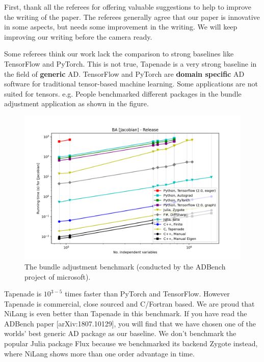 \documentclass{article}
\begin{document}
First, thank all the referees for offering valuable suggestions to help to improve the writing of the paper.
The referees generally agree that our paper is innovative in some aspects, but needs some improvement in the writing.
We will keep improving our writing before the camera ready.

Some referees think our work lack the comparison to strong baselines like TensorFlow and PyTorch.
This is not true, Tapenade is a very strong baseline in the field of \textbf{generic} AD.
TensorFlow and PyTorch are \textbf{domain specific} AD software for traditional tensor-based machine learning.
Some applications are not suited for tensors.
e.g. People benchmarked different packages in the bundle adjustment application as shown in the figure.
\begin{figure}
    \centerline{\includegraphics[width=0.5\columnwidth,trim={0 1cm 1cm 1.7cm},clip]{ba-jacobian-adbench.png}}
    \caption{The bundle adjustment benchmark (conducted by the ADBench project of microsoft).}\label{bench-ba}
\end{figure}
Tapenade is $10^{3-5}$ times faster than PyTorch and TensorFlow. However Tapenade is commercial, close sourced and C/Fortran based.
We are proud that NiLang is even better than Tapenade in this benchmark.
If you have read the ADBench paper [arXiv:1807.10129], you will find that we have chosen one of the worlds' best generic AD package as our baseline.
We don't benchmark the popular Julia package Flux because we benchmarked its backend Zygote instead, where NiLang shows more than one order advantage in time.
\end{document}
